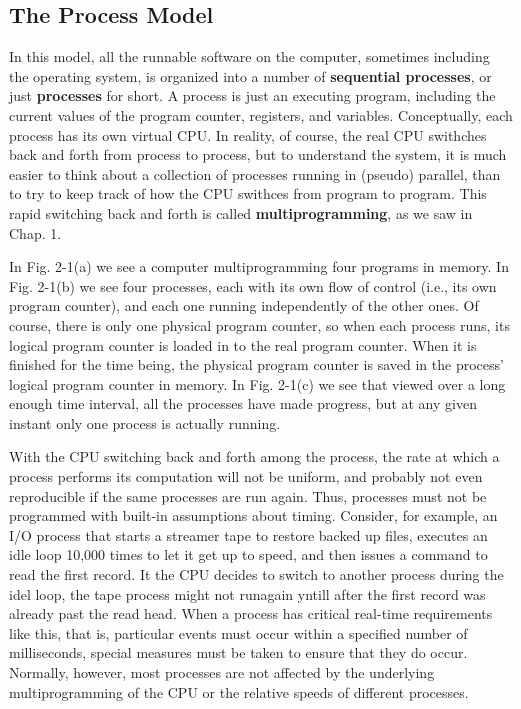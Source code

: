 \documentclass{book}
\newcommand {\kw}  [1] {\textbf{#1}}
\begin{document}
\subsection{The Process Model}
In this model, all the runnable software on the computer, sometimes including the operating system, 
is organized into a number of \kw{sequential processes}, or just \kw{processes} for short.
A process is just an executing program, including the current values of the program counter, registers, and variables.
Conceptually, each process has its own virtual CPU.
In reality, of course, the real CPU swithches back and forth from process to process,
but to understand the system, it is much easier to think about a collection of processes running in (pseudo) parallel,
than to try to keep track of how the CPU swithces from program to program.
This rapid switching back and forth is called \kw{multiprogramming}, as we saw in Chap. 1.

In Fig. 2-1(a) we see a computer multiprogramming four programs in memory.
In Fig. 2-1(b) we see four processes, each with its own flow of control (i.e., its own program counter), 
and each one running independently of the other ones.
Of course, there is only one physical program counter, so when each process runs, 
its logical program counter is loaded in to the real program counter. 
When it is finished for the time being, the physical program counter is saved in the process' logical program counter in memory.
In Fig. 2-1(c) we see that viewed over a long enough time interval, all the processes have made progress,
but at any given instant only one process is actually running.

With the CPU switching back and forth among the process, the rate at which a process performs its computation will not be uniform, 
and probably not even reproducible if the same processes are run again.
Thus, processes must not be programmed with built-in assumptions about timing.
Consider, for example, an I/O process that starts a streamer tape to restore backed up files,
executes an idle loop 10,000 times to let it get up to speed, and then issues a command to read the first record.
It the CPU decides to switch to another process during the idel loop,
the tape process might not runagain yntill after the first record was already past the read head.
When a process has critical real-time requirements like this, that is, 
particular events must occur within a specified number of milliseconds, special measures must be taken to ensure that they do occur.
Normally, however, most processes are not affected by the underlying multiprogramming of the CPU or the relative speeds of different processes.
\end{document}

